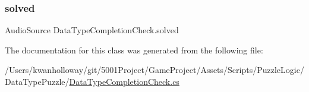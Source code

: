 \subsubsection{\texorpdfstring{solved}{solved}}
{\footnotesize\ttfamily Audio\+Source Data\+Type\+Completion\+Check.\+solved}



The documentation for this class was generated from the following file\+:\begin{DoxyCompactItemize}
\item 
/\+Users/kwanholloway/git/5001\+Project/\+Game\+Project/\+Assets/\+Scripts/\+Puzzle\+Logic/\+Data\+Type\+Puzzle/\hyperlink{_data_type_completion_check_8cs}{Data\+Type\+Completion\+Check.\+cs}\end{DoxyCompactItemize}

